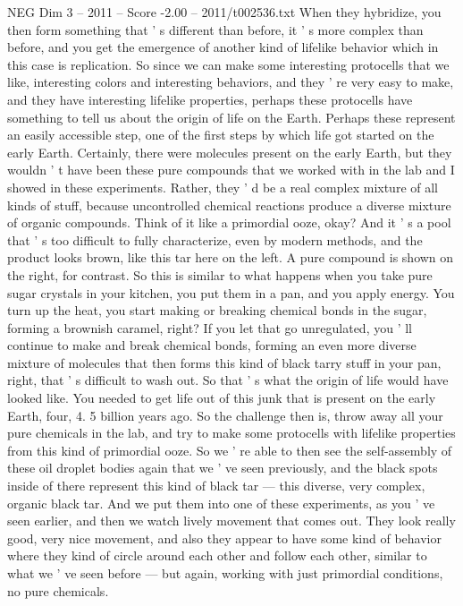 \begin{textsample}{NEG Dim 3 – 2011 – Score -2.00 – 2011/t002536.txt}
When they hybridize, you then form something that ' s different than before, it ' s more complex than before, and you get the emergence of another kind of lifelike behavior which in this case is replication.
So since we can make some interesting protocells that we like, interesting colors and interesting behaviors, and they ' re very easy to make, and they have interesting lifelike properties, perhaps these protocells have something to tell us about the origin of life on the Earth.
Perhaps these represent an easily accessible step, one of the first steps by which life got started on the early Earth.
Certainly, there were molecules present on the early Earth, but they wouldn ' t have been these pure compounds that we worked with in the lab and I showed in these experiments.
Rather, they ' d be a real complex mixture of all kinds of stuff, because uncontrolled chemical reactions produce a diverse mixture of organic compounds.
Think of it like a primordial ooze, okay?
And it ' s a pool that ' s too difficult to fully characterize, even by modern methods, and the product looks brown, like this tar here on the left.
A pure compound is shown on the right, for contrast.
So this is similar to what happens when you take pure sugar crystals in your kitchen, you put them in a pan, and you apply energy.
You turn up the heat, you start making or breaking chemical bonds in the sugar, forming a brownish caramel, right?
If you let that go unregulated, you ' ll continue to make and break chemical bonds, forming an even more diverse mixture of molecules that then forms this kind of black tarry stuff in your pan, right, that ' s difficult to wash out.
So that ' s what the origin of life would have looked like.
You needed to get life out of this junk that is present on the early Earth, four, 4. 5 billion years ago.
So the challenge then is, throw away all your pure chemicals in the lab, and try to make some protocells with lifelike properties from this kind of primordial ooze.
So we ' re able to then see the self-assembly of these oil droplet bodies again that we ' ve seen previously, and the black spots inside of there represent this kind of black tar — this diverse, very complex, organic black tar.
And we put them into one of these experiments, as you ' ve seen earlier, and then we watch lively movement that comes out.
They look really good, very nice movement, and also they appear to have some kind of behavior where they kind of circle around each other and follow each other, similar to what we ' ve seen before — but again, working with just primordial conditions, no pure chemicals.

\end{textsample}

